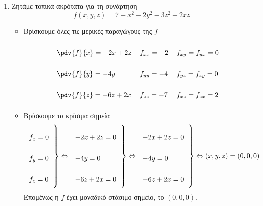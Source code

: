 \begin{enumerate}
	\item Ζητάμε τοπικά ακρότατα για τη συνάρτηση
		 \[
			 f(x,y,z) = 7 - x^{2} - 2y^{2} - 3z^{2} +2xz 
		 \] 
		 \begin{itemize}
			 \item  Βρίσκουμε όλες τις μερικές παραγώγους της  $f$
				 \[
					 \renewcommand{\arraystretch}{2.5}
					  \begin{tabular}{lll}
						  $\pdv{f}{x} = -2x+2z$ & $f_{xx} = -2$ &  $f_{xy}=f_{yx}=0$ \\
						  $\pdv{f}{y} = -4y $& $f_{yy} = -4$ & $f_{yz}=f_{zy}=0$ \\
						  $\pdv{f}{z} = -6z + 2x$ & $f_{zz} = -7$ &  $f_{xz}=f_{zx}=2$ \\
					  \end{tabular} 
				 \] 

	 \item  Βρίσκουμε τα κρίσιμα σημεία
		   \[
					\left.
						\begin{tabular}{l}
							$ f_{x} = 0	$ \\
							$ f_{y} = 0 	$\\
							$ f_{z} = 0 	$\\

						\end{tabular}
					\right\}   \Leftrightarrow 
					\left.
						\begin{tabular}{l}
							$-2x+2z=0	$ \\
							$ -4y=0 	$ \\
							$ -6z+2x=0  	$
						\end{tabular}
					\right\}   \Leftrightarrow 
					\left.
						\begin{tabular}{l}
							$-2x+2z=0	$ \\
							$ -4y=0 	$ \\
							$ -6z+2x=0  	$
						\end{tabular}
					\right\} \Leftrightarrow (x,y,z)=(0,0,0)
		   \] 
		   Επομένως η  $f$  έχει μοναδικό στάσιμο σημείο, το  $ (0,0,0) $.


\end{itemize}
\end{enumerate}
